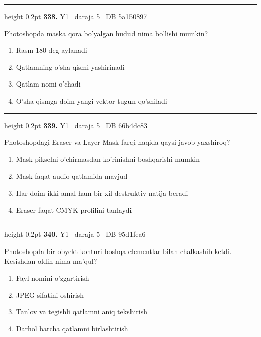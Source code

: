 \documentclass[10pt,a4paper,oneside]{article}
\begin{document}
\vspace{2mm}\hrule height 0.2pt \vspace{4mm}
\hypertarget{q338}{\textbf{\color{ink}338.}}  {\color{muted}\scriptsize Y1 \textbullet\ daraja 5 \textbullet\ DB 5a150897}
\par
Photoshopda maska qora bo'yalgan hudud nima bo'lishi mumkin?
\begin{enumerate}[label=\Alph*),leftmargin=9mm]
\item Rasm 180 deg  aylanadi
\item Qatlamning o'sha qismi yashirinadi
\item Qatlam nomi o'chadi
\item O'sha qismga doim yangi vektor tugun qo'shiladi
\end{enumerate}
\vspace{2mm}\hrule height 0.2pt \vspace{4mm}
\hypertarget{q339}{\textbf{\color{ink}339.}}  {\color{muted}\scriptsize Y1 \textbullet\ daraja 5 \textbullet\ DB 66b4dc83}
\par
Photoshopdagi Eraser va Layer Mask farqi haqida qaysi javob yaxshiroq?
\begin{enumerate}[label=\Alph*),leftmargin=9mm]
\item Mask pikselni o'chirmasdan ko'rinishni boshqarishi mumkin
\item Mask faqat audio qatlamida mavjud
\item Har doim ikki amal ham bir xil destruktiv natija beradi
\item Eraser faqat CMYK profilini tanlaydi
\end{enumerate}
\vspace{2mm}\hrule height 0.2pt \vspace{4mm}
\hypertarget{q340}{\textbf{\color{ink}340.}}  {\color{muted}\scriptsize Y1 \textbullet\ daraja 5 \textbullet\ DB 95d1fea6}
\par
Photoshopda bir obyekt konturi boshqa elementlar bilan chalkashib ketdi. Kesishdan oldin nima ma'qul?
\begin{enumerate}[label=\Alph*),leftmargin=9mm]
\item Fayl nomini o'zgartirish
\item JPEG sifatini oshirish
\item Tanlov va tegishli qatlamni aniq tekshirish
\item Darhol barcha qatlamni birlashtirish
\end{enumerate}
\end{document}
